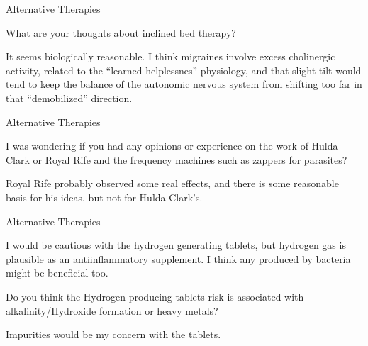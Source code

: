 \documentclass[11pt,oneside,openany,extrafontsizes]{memoir}
\begin{document}
\begin{qaexchange}{Alternative Therapies}

    \begin{question}
        What are your thoughts about inclined bed therapy?
    \end{question}

    \begin{answer}
       It seems biologically reasonable. I think migraines involve excess cholinergic activity, related to the \enquote{learned helplessnes} physiology, and that slight tilt would tend to keep the balance of the autonomic nervous system from shifting too far in that \enquote{demobilized} direction.
    \end{answer}
\end{qaexchange}

\begin{qaexchange}{Alternative Therapies}

    \begin{question}
        I was wondering if you had any opinions or experience on the work of Hulda Clark or Royal Rife and the frequency machines such as zappers for parasites?
    \end{question}

    \begin{answer}
      Royal Rife probably observed some real effects, and there is some reasonable basis for his ideas, but not for Hulda Clark's.
    \end{answer}
\end{qaexchange}

\begin{emailexchange}{Alternative Therapies}

    \begin{answer}
       I would be cautious with the hydrogen generating tablets, but hydrogen gas is plausible as an antiinflammatory supplement. I think any produced by bacteria might be beneficial too. 
    \end{answer}

    \begin{question}
        Do you think the Hydrogen producing tablets risk is associated with alkalinity/Hydroxide formation or heavy metals?
    \end{question}

    \begin{answer}
      Impurities would be my concern with the tablets.
    \end{answer}
\end{emailexchange}
\end{document}
